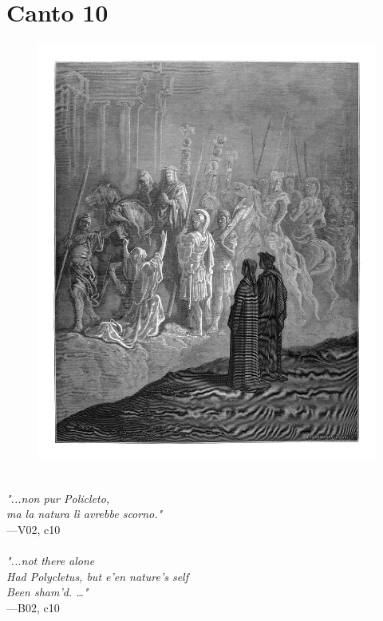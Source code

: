 \documentclass[../Dore_vision.tex]{subfiles}
\begin{document}
\newpage

\section{Canto 10}

\begin{figure}[ht]
\centering
\includegraphics[height=\figsize]{illustrations/book_2/V02, c10.jpg}
\end{figure}

\begin{center}
\begin{minipage}{0.8\linewidth}
\textit{\\
"...non pur Policleto,\\ma la natura lì avrebbe scorno."} \\
—V02, c10 \\~\\
\textit{"...not there alone\\Had Polycletus, but e'en nature's self\\Been sham'd. …"} \\
—B02, c10
\end{minipage}
\end{center}
\end{document}
